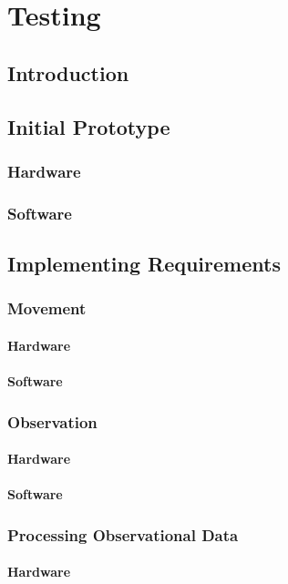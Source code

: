 	\chapter{Testing}
		\section{Introduction}
		\section{Initial Prototype}
			\subsection{Hardware}
			\subsection{Software}
		\section{Implementing Requirements}
			\subsection{Movement}
				\subsubsection{Hardware}
				\subsubsection{Software}
			\subsection{Observation}
				\subsubsection{Hardware}
				\subsubsection{Software}
			\subsection{Processing Observational Data}
				\subsubsection{Hardware}
